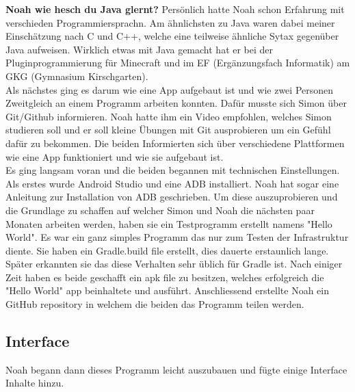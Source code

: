 \documentclass[a4paper,11pt]{article}
\begin{document}
\textbf{ Noah wie hesch du Java glernt?}
Persönlich hatte Noah schon Erfahrung mit verschieden Programmiersprachn. Am ähnlichsten zu Java waren dabei meiner Einschätzung nach C und C++, welche eine teilweise ähnliche Sytax gegenüber Java aufweisen. Wirklich etwas mit Java gemacht hat er bei der Pluginprogrammierung für Minecraft und im EF (Ergänzungsfach Informatik) am GKG (Gymnasium Kirschgarten).\\

Als nächstes ging es darum wie eine App aufgebaut ist und wie zwei Personen Zweitgleich an einem 
Programm arbeiten konnten. Dafür musste sich Simon über Git/Github informieren. Noah hatte ihm ein Video empfohlen, welches 
Simon studieren soll und er soll kleine Übungen mit Git ausprobieren um ein Gefühl dafür zu bekommen. Die beiden Informierten 
sich über verschiedene Plattformen wie eine App funktioniert und wie sie aufgebaut ist. \\ 

Es ging langsam voran und die beiden begannen mit technischen Einstellungen. Als erstes 
wurde Android Studio  und eine ADB installiert. Noah hat sogar eine Anleitung zur Installation von ADB geschrieben. 
Um diese auszuprobieren und die Grundlage zu schaffen auf welcher Simon und Noah die nächsten paar Monaten arbeiten werden, haben sie ein
Testprogramm erstellt namens "Hello World". Es war ein ganz simples Programm das nur zum Testen der Infrastruktur diente. 
Sie haben ein Gradle.build file erstellt, dies dauerte erstaunlich lange. Später erkannten sie das diese Verhalten sehr üblich für 
Gradle ist. Nach einiger Zeit haben es beide geschafft ein apk file zu besitzen, welches erfolgreich die "Hello World" app beinhaltete und ausführt. 
Anschliessend erstellte Noah ein GitHub repository in welchem die beiden das Programm teilen werden. \\


\subsection{Interface}

Noah begann dann dieses Programm leicht auszubauen und fügte einige Interface Inhalte hinzu. 

\begingroup
\setlength{\intextsep}{10pt}
\setlength{\columnsep}{15pt}
\end{document}
